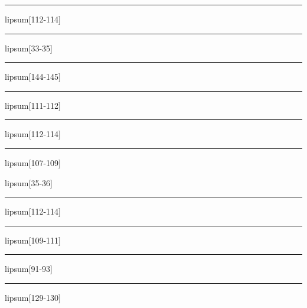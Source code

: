 \documentclass[11pt,a4paper]{article}
\begin{document}
\begin{simplewrap}
  \textcolor{brown!29}{\rule{4.7cm}{9.3cm}}
\end{simplewrap}
lipsum[112-114]

\begin{simplewrap}
  \textcolor{lime!15}{\rule{4.7cm}{6.9cm}}
\end{simplewrap}
lipsum[33-35]

\begin{simplewrap}
  \textcolor{blue!33}{\rule{5.7cm}{9.7cm}}
\end{simplewrap}
lipsum[144-145]

\begin{simplewrap}
  \textcolor{lime!17}{\rule{5.6cm}{8.9cm}}
\end{simplewrap}
lipsum[111-112]

\begin{simplewrap}
  \textcolor{pink!50}{\rule{4.0cm}{5.1cm}}
\end{simplewrap}
lipsum[112-114]

\begin{simplewrap}
  \textcolor{cyan!40}{\rule{3.4cm}{6.4cm}}
\end{simplewrap}
lipsum[107-109]

lipsum[35-36]

\begin{simplewrap}
  \textcolor{red!14}{\rule{4.9cm}{3.2cm}}
\end{simplewrap}
lipsum[112-114]

\begin{simplewrap}
  \textcolor{purple!15}{\rule{3.4cm}{8.4cm}}
\end{simplewrap}
lipsum[109-111]

\begin{simplewrap}
  \textcolor{blue!42}{\rule{4.3cm}{8.6cm}}
\end{simplewrap}
lipsum[91-93]

\begin{simplewrap}
  \textcolor{olive!48}{\rule{3.0cm}{6.0cm}}
\end{simplewrap}
lipsum[129-130]
\end{document}
